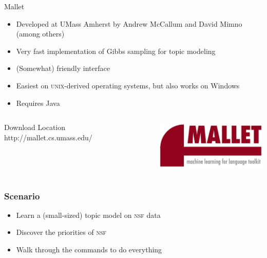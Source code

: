 \begin{frame}{Mallet}

\begin{itemize}
  \item Developed at UMass Amherst by Andrew McCallum and David Mimno (among others)
  \item Very fast implementation of Gibbs sampling for topic modeling
  \item (Somewhat) friendly interface
  \item Easiest on \textsc{unix}-derived operating systems, but also works on Windows
  \item Requires Java
\end{itemize}

\begin{columns}
\begin{block}{Download Location}
  http://mallet.cs.umass.edu/
\end{block}
\includegraphics[width=.9\linewidth]{topic_models/mallet}
\end{columns}
\end{frame}


\begin{frame}
  \frametitle{Scenario}

  \begin{itemize}
    \item Learn a (small-sized) topic model on \textsc{nsf} data
    \item Discover the priorities of \textsc{nsf}
    \item Walk through the commands to do everything
  \end{itemize}
\end{frame}

